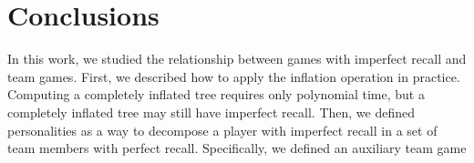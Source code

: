 \chapter{Conclusions}\label{C6}

In this work, we studied the relationship between games with imperfect recall and team games. First, we described how to apply the inflation operation in practice. Computing a completely inflated tree requires only polynomial time, but a completely inflated tree may still have imperfect recall. 
%
Then, we defined personalities as a way to decompose a player with imperfect recall in a set of team members with perfect recall. Specifically, we defined an auxiliary team game 


